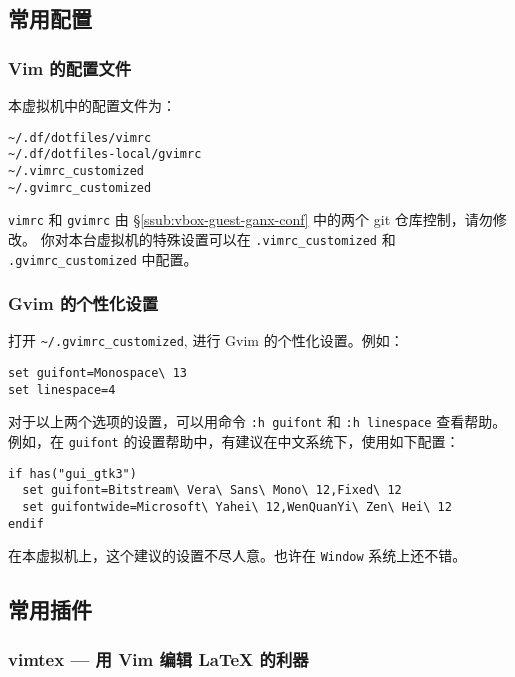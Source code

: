 \documentclass[
    11pt,
    cite=authoryear,
    device=phone,
    lang=cn,
    mode=simple,
    result=answer,
    toc=onecol,
]{elegantbook_sierxue}
\begin{document}
\subsection{常用配置}%
\label{sub:vim-intro}

\subsubsection{Vim 的配置文件}%
\label{ssub:vim-config}

本虚拟机中的配置文件为：
\begin{lstlisting}[escapeinside=``]
~/.df/dotfiles/vimrc
~/.df/dotfiles-local/gvimrc
~/.vimrc_customized
~/.gvimrc_customized
\end{lstlisting}
\lstinline{vimrc} 和 \lstinline{gvimrc} 由
\S\ref{ssub:vbox-guest-ganx-conf} 中的两个 git 仓库控制，请勿修改。
你对本台虚拟机的特殊设置可以在 \lstinline{.vimrc_customized} 和
\lstinline{.gvimrc_customized} 中配置。

\subsubsection{Gvim 的个性化设置}%
\label{ssub:vim-gui-config-customized}

打开 \lstinline{~/.gvimrc_customized}, 进行 Gvim 的个性化设置。例如：
\begin{lstlisting}[escapeinside=``]
set guifont=Monospace\ 13
set linespace=4
\end{lstlisting}
对于以上两个选项的设置，可以用命令 \lstinline{:h guifont} 和
\lstinline{:h linespace} 查看帮助。
例如，在 \lstinline{guifont} 的设置帮助中，有建议在中文系统下，使用如下配置：
\begin{lstlisting}[escapeinside=``]
if has("gui_gtk3")
  set guifont=Bitstream\ Vera\ Sans\ Mono\ 12,Fixed\ 12
  set guifontwide=Microsoft\ Yahei\ 12,WenQuanYi\ Zen\ Hei\ 12
endif
\end{lstlisting}
\begin{note}\label{note:guifont}
    在本虚拟机上，这个建议的设置不尽人意。也许在 \lstinline{Window}
    系统上还不错。
\end{note}

\subsection{常用插件}%
\label{sub:vim-plugins}

\subsubsection{vimtex --- 用 Vim 编辑 \LaTeX{} 的利器}%
\label{ssub:vim-plugin-vimtex}
\end{document}
